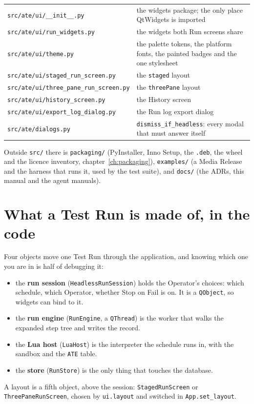 \begin{longtable}{p{5.6cm} p{9.4cm}}
\texttt{src/\allowbreak{}ate/\allowbreak{}ui/\allowbreak\_\allowbreak\_\allowbreak{}init\_\allowbreak\_\allowbreak.py} & the widgets package; the only place QtWidgets is imported \\
\texttt{src/\allowbreak{}ate/\allowbreak{}ui/\allowbreak{}run\_\allowbreak{}widgets.py} & the widgets both Run screens share \\
\texttt{src/\allowbreak{}ate/\allowbreak{}ui/\allowbreak{}theme.py} & the palette tokens, the platform fonts, the painted badges and the one stylesheet \\
\texttt{src/\allowbreak{}ate/\allowbreak{}ui/\allowbreak{}staged\_\allowbreak{}run\_\allowbreak{}screen.py} & the \texttt{staged} layout \\
\texttt{src/\allowbreak{}ate/\allowbreak{}ui/\allowbreak{}three\_\allowbreak{}pane\_\allowbreak{}run\_\allowbreak{}screen.py} & the \texttt{threePane} layout \\
\texttt{src/\allowbreak{}ate/\allowbreak{}ui/\allowbreak{}history\_\allowbreak{}screen.py} & the History screen \\
\texttt{src/\allowbreak{}ate/\allowbreak{}ui/\allowbreak{}export\_\allowbreak{}log\_\allowbreak{}dialog.py} & the Run log export dialog \\
\texttt{src/ate/dialogs.py} & \texttt{dismiss\_\allowbreak{}if\_\allowbreak{}headless}: every modal that must answer itself \\
\bottomrule
\end{longtable}
\endgroup

Outside \texttt{src/} there is \texttt{packaging/} (PyInstaller, Inno Setup, the \texttt{.deb}, the wheel
and the licence inventory, chapter~\ref{ch:packaging}), \texttt{examples/} (a Media Release and the
harness that runs it, used by the test suite), and \texttt{docs/} (the ADRs, this manual and the agent
manuals).

\section{What a Test Run is made of, in the code}

Four objects move one Test Run through the application, and knowing which one you are in is half of
debugging it:

\begin{itemize}
  \item the \textbf{run session} (\texttt{HeadlessRunSession}) holds the Operator's choices: which
    schedule, which Operator, whether Stop on Fail is on. It is a \texttt{QObject}, so widgets can bind
    to it.
  \item the \textbf{run engine} (\texttt{RunEngine}, a \texttt{QThread}) is the worker that walks the
    expanded step tree and writes the record.
  \item the \textbf{Lua host} (\texttt{LuaHost}) is the interpreter the schedule runs in, with the
    sandbox and the \texttt{ATE} table.
  \item the \textbf{store} (\texttt{RunStore}) is the only thing that touches the database.
\end{itemize}

A layout is a fifth object, above the session: \texttt{StagedRunScreen} or \texttt{ThreePaneRunScreen},
chosen by \texttt{ui.layout} and switched in \texttt{App.set\_layout}.

